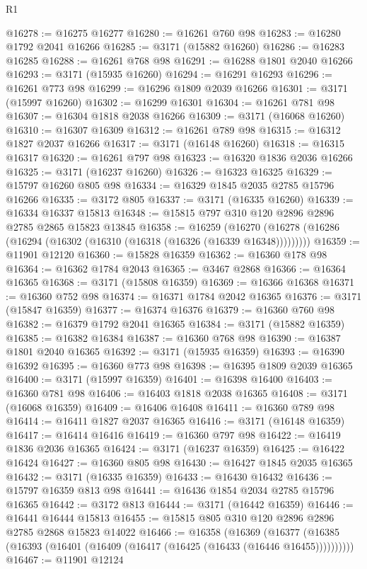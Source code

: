 \begin{lexlean}{R1}
\begin{coremodule}
@16278 := @16275 @16277
@16280 := @16261 @760 @98
@16283 := @16280 @1792 @2041 @16266
@16285 := @3171 (@15882 @16260)
@16286 := @16283 @16285
@16288 := @16261 @768 @98
@16291 := @16288 @1801 @2040 @16266
@16293 := @3171 (@15935 @16260)
@16294 := @16291 @16293
@16296 := @16261 @773 @98
@16299 := @16296 @1809 @2039 @16266
@16301 := @3171 (@15997 @16260)
@16302 := @16299 @16301
@16304 := @16261 @781 @98
@16307 := @16304 @1818 @2038 @16266
@16309 := @3171 (@16068 @16260)
@16310 := @16307 @16309
@16312 := @16261 @789 @98
@16315 := @16312 @1827 @2037 @16266
@16317 := @3171 (@16148 @16260)
@16318 := @16315 @16317
@16320 := @16261 @797 @98
@16323 := @16320 @1836 @2036 @16266
@16325 := @3171 (@16237 @16260)
@16326 := @16323 @16325
@16329 := @15797 @16260 @805 @98
@16334 := @16329 @1845 @2035 @2785 @15796 @16266
@16335 := @3172 @805
@16337 := @3171 (@16335 @16260)
@16339 := @16334 @16337 @15813
@16348 := @15815 @797 @310 @120 @2896 @2896 @2785 @2865 @15823 @13845
@16358 := @16259
    (@16270 (@16278 (@16286 (@16294 (@16302 (@16310 (@16318 (@16326 (@16339 @16348)))))))))
@16359 := @11901 @12120
@16360 := @15828 @16359
@16362 := @16360 @178 @98
@16364 := @16362 @1784 @2043
@16365 := @3467 @2868
@16366 := @16364 @16365
@16368 := @3171 (@15808 @16359)
@16369 := @16366 @16368
@16371 := @16360 @752 @98
@16374 := @16371 @1784 @2042 @16365
@16376 := @3171 (@15847 @16359)
@16377 := @16374 @16376
@16379 := @16360 @760 @98
@16382 := @16379 @1792 @2041 @16365
@16384 := @3171 (@15882 @16359)
@16385 := @16382 @16384
@16387 := @16360 @768 @98
@16390 := @16387 @1801 @2040 @16365
@16392 := @3171 (@15935 @16359)
@16393 := @16390 @16392
@16395 := @16360 @773 @98
@16398 := @16395 @1809 @2039 @16365
@16400 := @3171 (@15997 @16359)
@16401 := @16398 @16400
@16403 := @16360 @781 @98
@16406 := @16403 @1818 @2038 @16365
@16408 := @3171 (@16068 @16359)
@16409 := @16406 @16408
@16411 := @16360 @789 @98
@16414 := @16411 @1827 @2037 @16365
@16416 := @3171 (@16148 @16359)
@16417 := @16414 @16416
@16419 := @16360 @797 @98
@16422 := @16419 @1836 @2036 @16365
@16424 := @3171 (@16237 @16359)
@16425 := @16422 @16424
@16427 := @16360 @805 @98
@16430 := @16427 @1845 @2035 @16365
@16432 := @3171 (@16335 @16359)
@16433 := @16430 @16432
@16436 := @15797 @16359 @813 @98
@16441 := @16436 @1854 @2034 @2785 @15796 @16365
@16442 := @3172 @813
@16444 := @3171 (@16442 @16359)
@16446 := @16441 @16444 @15813
@16455 := @15815 @805 @310 @120 @2896 @2896 @2785 @2868 @15823 @14022
@16466 := @16358
    (@16369 (@16377 (@16385 (@16393 (@16401 (@16409 (@16417 (@16425 (@16433 (@16446 @16455))))))))))
@16467 := @11901 @12124

\end{coremodule}
\end{lexlean}
